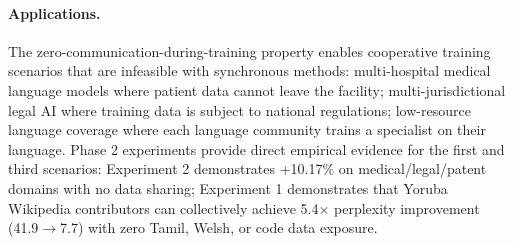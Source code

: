 \documentclass{article}
\begin{document}
\paragraph{Applications.} The zero-communication-during-training property enables cooperative training scenarios that are infeasible with synchronous methods: multi-hospital medical language models where patient data cannot leave the facility; multi-jurisdictional legal AI where training data is subject to national regulations; low-resource language coverage where each language community trains a specialist on their language. Phase 2 experiments provide direct empirical evidence for the first and third scenarios: Experiment 2 demonstrates +10.17\% on medical/legal/patent domains with no data sharing; Experiment 1 demonstrates that Yoruba Wikipedia contributors can collectively achieve 5.4$\times$ perplexity improvement (41.9$\to$7.7) with zero Tamil, Welsh, or code data exposure.
\end{document}
